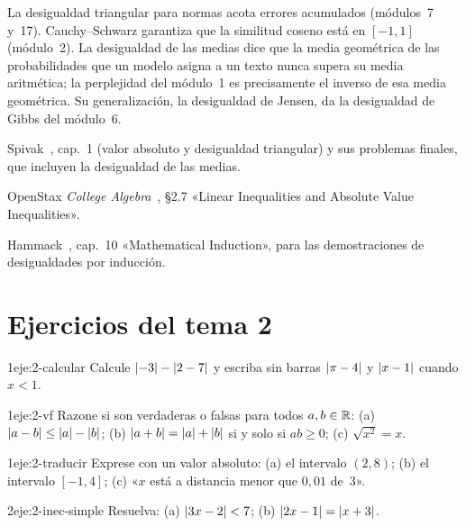 \begin{observacion}
La desigualdad triangular para normas acota errores acumulados (módulos~7 y~17). Cauchy--Schwarz garantiza que la similitud coseno está en $[-1,1]$ (módulo~2). La desigualdad de las medias dice que la media geométrica de las probabilidades que un modelo asigna a un texto nunca supera su media aritmética; la perplejidad del módulo~1 es precisamente el inverso de esa media geométrica. Su generalización, la desigualdad de Jensen, da la desigualdad de Gibbs del módulo~6.
\end{observacion}

\begin{lecturas}
\item Spivak~\cite{spivak}, cap.~1 (valor absoluto y desigualdad triangular) y sus problemas finales, que incluyen la desigualdad de las medias.
\item OpenStax \emph{College Algebra}~\cite{openstax}, §2.7 «Linear Inequalities and Absolute Value Inequalities».
\item Hammack~\cite{hammack}, cap.~10 «Mathematical Induction», para las demostraciones de desigualdades por inducción.
\end{lecturas}

\section*{Ejercicios del tema 2}

\begin{ejercicio}{1}{eje:2-calcular}
Calcule $\lvert-3\rvert-\lvert2-7\rvert$ y escriba sin barras $\lvert\pi-4\rvert$ y $\lvert x-1\rvert$ cuando $x<1$.
\end{ejercicio}

\begin{ejercicio}{1}{eje:2-vf}
Razone si son verdaderas o falsas para todos $a,b\in\mathbb{R}$: (a) $\lvert a-b\rvert\le\lvert a\rvert-\lvert b\rvert$; (b) $\lvert a+b\rvert=\lvert a\rvert+\lvert b\rvert$ si y solo si $ab\ge0$; (c) $\sqrt{x^2}=x$.
\end{ejercicio}

\begin{ejercicio}{1}{eje:2-traducir}
Exprese con un valor absoluto: (a) el intervalo $(2,8)$; (b) el intervalo $[-1,4]$; (c) «$x$ está a distancia menor que $0{,}01$ de~$3$».
\end{ejercicio}

\begin{ejercicio}{2}{eje:2-inec-simple}
Resuelva: (a) $\lvert3x-2\rvert<7$; (b) $\lvert2x-1\rvert=\lvert x+3\rvert$.
\end{ejercicio}

